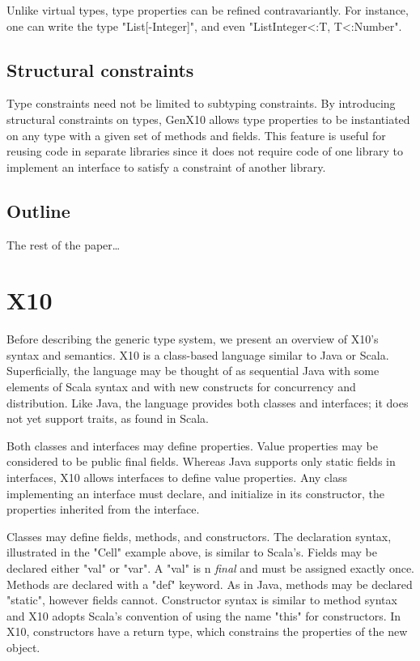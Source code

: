 \documentclass[preprint,nocopyrightspace,9pt]{sigplanconf}
\begin{document}
Unlike virtual types, type properties can be refined contravariantly.
For instance, one can write the type \xcd"List[-Integer]",
and even \xcd"List{Integer<:T, T<:Number}".

\subsection{Structural constraints}

Type constraints need not be limited to subtyping constraints.
By introducing structural constraints on types, GenX10 allows
type properties to be instantiated on any type with a given set
of methods and fields. This feature is useful for reusing code
in separate libraries since it does not require 
code of one library to implement an interface to satisfy a
constraint of another library.


\subsection{Outline}

The rest of the paper\dots

\section{X10}

Before describing the generic type system, we present an
overview of X10's syntax and semantics.
X10 is a class-based language similar to Java or Scala.
Superficially, the language may be thought of as sequential
Java with some elements of Scala syntax and with new constructs
for concurrency and distribution.
Like Java, the language provides both classes and interfaces; it does not
yet support traits, as found in Scala.

Both classes and interfaces may define properties. Value
properties may be considered to be public final fields. Whereas
Java supports only static fields in interfaces, X10
allows interfaces to define value properties. Any class implementing
an interface must declare, and initialize in its
constructor,
the properties inherited from the interface.

Classes may define fields, methods, and constructors. The
declaration syntax,
illustrated in the \xcd"Cell" example
above,
is similar to Scala's.  Fields may be
declared either \xcd"val" or \xcd"var".  A \xcd"val" is n
\emph{final} and must be assigned exactly once.  Methods are
declared with a \xcd"def" keyword.
As in Java, methods may be declared \xcd"static", however fields cannot.
Constructor syntax is
similar to method syntax and X10 adopts Scala's convention of
using the name \xcd"this" for constructors.
In X10, constructors have a return type, which constrains
the properties of the new object.
\end{document}
